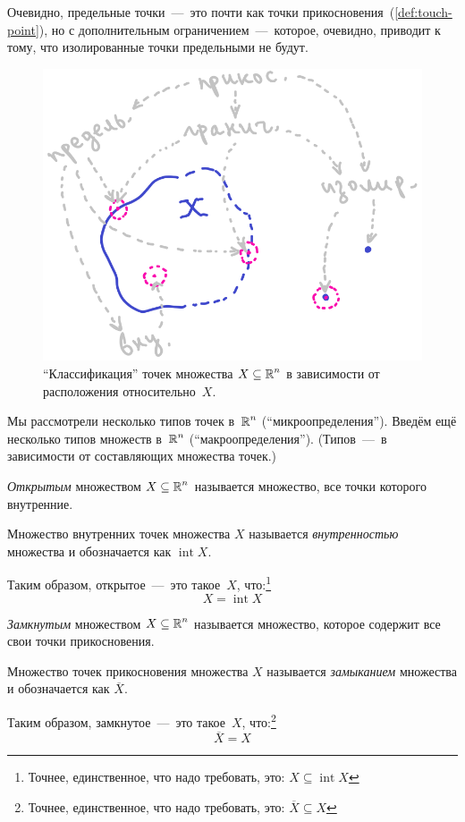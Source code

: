 \documentclass[a4paper,12pt]{article}
\begin{document}
  Очевидно, предельные точки~---~это почти как точки прикосновения~(\ref{def:touch-point}), но с дополнительным ограничением~---~которое, очевидно, приводит к тому, что изолированные точки предельными не будут.

  \begin{figure}[ht]
    \centering
  
    \includegraphics[width=0.8\columnwidth]{vector-types-by-neighbourhood}
  
    \caption{
      ``Классификация'' точек множества $X \hm\subseteq \RR^n$ в зависимости от расположения относительно~$X$.
    }
    \label{fig:vector-types-by-neighbourhood}
  \end{figure}

  \medskip

  Мы рассмотрели несколько типов точек в~$\operatorname{\mathbb R}^n$ (``микроопределения'').
  Введём ещё несколько типов множеств в~$\operatorname{\mathbb R}^n$ (``макроопределения'').
  (Типов~---~в зависимости от составляющих множества точек.)


  \begin{definition}
      \emph{Открытым} множеством $X \subseteq \operatorname{\mathbb R}^n$ называется множество, все точки которого внутренние.

      Множество внутренних точек множества $X$ называется \emph{внутренностью} множества и обозначается как $\operatorname{int} X$.

      Таким образом, открытое~---~это такое~$X$, что:\footnote{
        Точнее, единственное, что надо требовать, это: $X \subseteq \operatorname{int} X$
      }
      \[
        X = \operatorname{int} X
      \]
  \end{definition}

  \begin{definition}
      \emph{Замкнутым} множеством $X \subseteq \operatorname{\mathbb R}^n$ называется множество, которое содержит все свои точки прикосновения.

      Множество точек прикосновения множества $X$ называется \emph{замыканием} множества и обозначается как $\overline X$.

      Таким образом, замкнутое~---~это такое~$X$, что:\footnote{
        Точнее, единственное, что надо требовать, это: $\overline X \subseteq X$
      }
      \[
        \overline X = X
      \]
  \end{definition}
\end{document}
